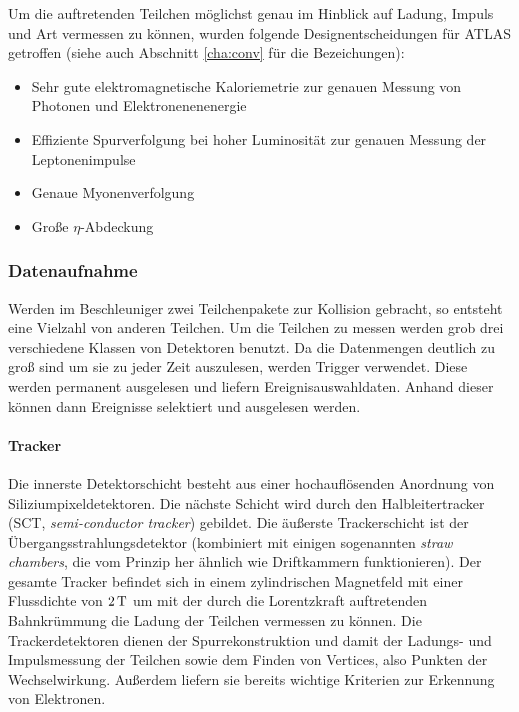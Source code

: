 Um die auftretenden Teilchen möglichst genau im Hinblick auf Ladung, Impuls und
Art vermessen zu können, wurden folgende Designentscheidungen für ATLAS
getroffen\cite{atlas-tp} (siehe auch Abschnitt \ref{cha:conv} für die
Bezeichungen):
\begin{itemize}
  \item Sehr gute elektromagnetische Kaloriemetrie zur genauen Messung von
    Photonen und Elektronenenenergie
  \item Effiziente Spurverfolgung bei hoher Luminosität zur genauen Messung der
    Leptonenimpulse
  \item Genaue Myonenverfolgung
  \item Große $\eta$-Abdeckung 
\end{itemize}

\subsubsection{Datenaufnahme}
\label{cha:aufnahme}
Werden im Beschleuniger zwei Teilchenpakete zur Kollision gebracht, so entsteht
eine Vielzahl von anderen Teilchen. Um die Teilchen zu messen werden grob drei
verschiedene Klassen von Detektoren benutzt. Da die Datenmengen deutlich zu groß
sind um sie zu jeder Zeit auszulesen, werden Trigger verwendet.  Diese werden
permanent ausgelesen und liefern Ereignisauswahldaten. Anhand dieser können dann
Ereignisse selektiert und ausgelesen werden.

\paragraph{Tracker}
Die innerste Detektorschicht besteht aus einer hochauflösenden Anordnung von
Siliziumpixeldetektoren. Die nächste Schicht wird durch den Halbleitertracker
(SCT, \emph{semi-conductor tracker}) gebildet. Die äußerste Trackerschicht ist
der Übergangsstrahlungsdetektor (kombiniert mit einigen sogenannten \emph{straw
chambers}, die vom Prinzip her ähnlich wie Driftkammern funktionieren). Der
gesamte Tracker befindet sich in einem zylindrischen Magnetfeld mit einer
Flussdichte von $\unit[2]{T}$ um mit der durch die Lorentzkraft auftretenden
Bahnkrümmung die Ladung der Teilchen vermessen zu können. Die Trackerdetektoren
dienen der Spurrekonstruktion und damit der Ladungs- und Impulsmessung der
Teilchen sowie dem Finden von Vertices, also Punkten der Wechselwirkung. Außerdem
liefern sie bereits wichtige Kriterien zur Erkennung von Elektronen.

